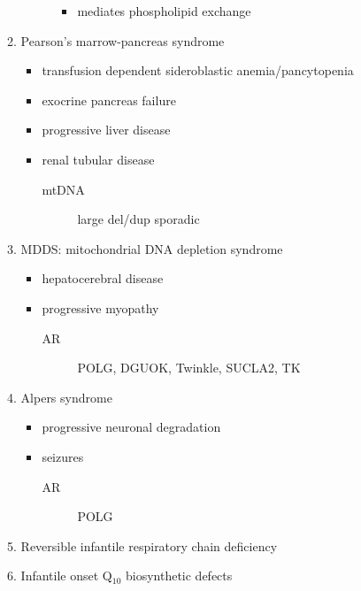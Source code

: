 \documentclass{scrartcl}
\begin{document}
\begin{enumerate}
\begin{enumerate}
\begin{description}
\begin{itemize}
\item mediates phospholipid exchange
\end{itemize}
\end{description}
\item Pearson's marrow-pancreas syndrome
\label{sec:org26848be}
\begin{itemize}
\item transfusion dependent sideroblastic anemia/pancytopenia
\item exocrine pancreas failure
\item progressive liver disease
\item renal tubular disease
\begin{description}
\item[{mtDNA}] large del/dup sporadic
\end{description}
\end{itemize}
\item MDDS: mitochondrial DNA depletion syndrome
\label{sec:orgf49679f}
\begin{itemize}
\item hepatocerebral disease
\item progressive myopathy
\begin{description}
\item[{AR}] POLG, DGUOK, Twinkle, SUCLA2, TK
\end{description}
\end{itemize}
\item Alpers syndrome
\label{sec:orgffe9605}
\begin{itemize}
\item progressive neuronal degradation
\item seizures
\begin{description}
\item[{AR}] POLG
\end{description}
\end{itemize}
\item Reversible infantile respiratory chain deficiency
\label{sec:org6e29d59}
\item Infantile onset Q\(_{\text{10}}\) biosynthetic defects
\label{sec:orgabbfadc}
\end{enumerate}


\end{enumerate}
\end{document}
